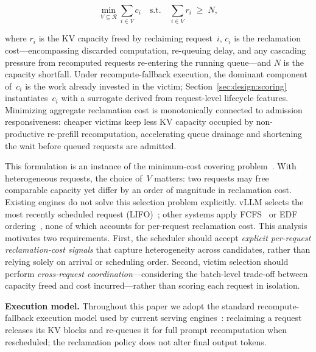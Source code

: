 \documentclass[sigconf,nonacm]{acmart}
\begin{document}
\begin{equation}\label{eq:victim}
  \min_{V \subseteq \mathcal{R}} \sum_{i \in V} c_i
  \quad \text{s.t.} \quad
  \sum_{i \in V} r_i \;\geq\; N,
\end{equation}

\noindent
where $r_i$ is the KV capacity freed by reclaiming request~$i$, $c_i$ is the
reclamation cost---encompassing discarded computation, re-queuing delay,
and any cascading pressure from recomputed requests re-entering the running
queue---and $N$ is the capacity shortfall.  Under recompute-fallback execution,
the dominant component of~$c_i$ is the work already invested in the victim;
Section~\ref{sec:design:scoring} instantiates~$c_i$ with a surrogate derived
from request-level lifecycle features.
Minimizing aggregate reclamation cost is monotonically connected to admission
responsiveness: cheaper victims keep less KV capacity occupied by
non-productive re-prefill recomputation, accelerating queue drainage and
shortening the wait before queued requests are admitted.

This formulation is an instance of the minimum-cost covering
problem~\cite{Kellerer2004}.  With heterogeneous requests, the choice of~$V$
matters: two requests may free comparable capacity yet differ by an order of
magnitude in reclamation cost.
Existing engines do not solve this selection problem explicitly.  vLLM selects
the most recently scheduled request (LIFO)~\cite{Kwon2023}; other systems apply
FCFS~\cite{Yu2022} or EDF ordering~\cite{Gujarati2020}, none of which accounts
for per-request reclamation cost.  This
analysis motivates two requirements.  First, the scheduler should accept
\emph{explicit per-request reclamation-cost signals} that capture
heterogeneity across candidates, rather than relying solely on arrival or
scheduling order.  Second, victim selection should perform \emph{cross-request
coordination}---considering the batch-level trade-off between capacity freed
and cost incurred---rather than scoring each request in isolation.

\noindent\textbf{Execution model.}  Throughout this paper we adopt the
standard recompute-fallback execution model used by current serving
engines~\cite{Kwon2023}: reclaiming a request releases its KV blocks and
re-queues it for full prompt recomputation when rescheduled; the reclamation
policy does not alter final output tokens.
\end{document}
